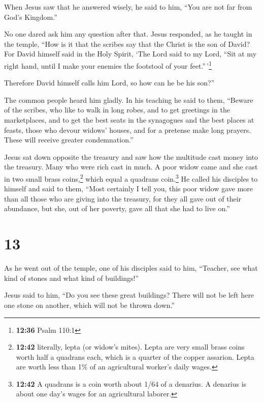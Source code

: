  When Jesus saw that he answered wisely, he said to him,
``You are not far from God's Kingdom.''

No one dared ask him any question after that.  Jesus
responded, as he taught in the temple, ``How is it that the scribes say
that the Christ is the son of David?  For David himself
said in the Holy Spirit, `The Lord said to my Lord, ``Sit at my right
hand, until I make your enemies the footstool of your
feet.''\,'\footnote{\textbf{12:36} Psalm 110:1}

 Therefore David himself calls him Lord, so how can he be
his son?''

The common people heard him gladly.  In his teaching he
said to them, ``Beware of the scribes, who like to walk in long robes,
and to get greetings in the marketplaces,  and to get the
best seats in the synagogues and the best places at feasts,
 those who devour widows' houses, and for a pretense make
long prayers. These will receive greater condemnation.''

 Jesus sat down opposite the treasury and saw how the
multitude cast money into the treasury. Many who were rich cast in much.
 A poor widow came and she cast in two small brass
coins,\footnote{\textbf{12:42} literally, lepta (or widow's mites).
  Lepta are very small brass coins worth half a quadrans each, which is
  a quarter of the copper assarion. Lepta are worth less than 1\% of an
  agricultural worker's daily wages.} which equal a quadrans
coin.\footnote{\textbf{12:42} A quadrans is a coin worth about 1/64 of a
  denarius. A denarius is about one day's wages for an agricultural
  laborer.}  He called his disciples to himself and said
to them, ``Most certainly I tell you, this poor widow gave more than all
those who are giving into the treasury,  for they all
gave out of their abundance, but she, out of her poverty, gave all that
she had to live on.''

\hypertarget{section-12}{%
\section{13}\label{section-12}}

 As he went out of the temple, one of his disciples said
to him, ``Teacher, see what kind of stones and what kind of buildings!''

 Jesus said to him, ``Do you see these great buildings?
There will not be left here one stone on another, which will not be
thrown down.''

